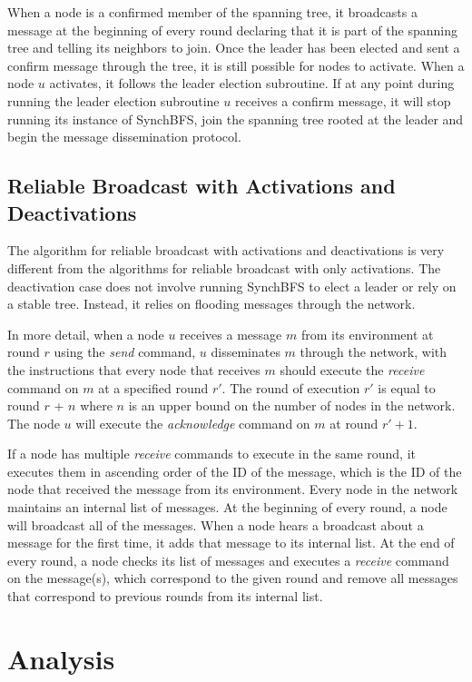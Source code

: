 \documentclass[english]{article}
\begin{document}
When a node is a confirmed member of the spanning tree, it broadcasts a message at the beginning of every round declaring that it is part of the spanning tree and telling its neighbors to join. Once the leader has been elected and sent a confirm message through the tree, it is still possible for nodes to activate. When a node $u$ activates, it follows the leader election subroutine. If at any point during running the leader election subroutine $u$ receives a confirm message, it will stop running its instance of SynchBFS, join the spanning tree rooted at the leader and begin the message dissemination protocol.


  \subsection {Reliable Broadcast with Activations and Deactivations}

The algorithm for reliable broadcast with activations and deactivations is very different from the algorithms for reliable broadcast with only activations. The deactivation case does not involve running SynchBFS to elect a leader or rely on a stable tree. Instead, it relies on flooding messages through the network.

In more detail, when a node $u$ receives a message $m$ from its environment at round $r$ using the \textit{send} command, $u$ disseminates $m$ through the network, with the instructions that every node that receives $m$ should execute the \textit{receive} command on $m$ at a specified round $r'$. The round of execution $r'$ is equal to round $r$ + $n$ where $n$ is an upper bound on the number of nodes in the network. The node $u$ will execute the \textit{acknowledge} command on $m$ at round $r' + 1$.

If a node has multiple \textit{receive} commands to execute in the same round, it executes them in ascending order of the ID of the message, which is the ID of the node that received the message from its environment. Every node in the network maintains an internal list of messages. At the beginning of every round, a node will broadcast all of the messages. When a node hears a broadcast about a message for the first time, it adds that message to its internal list. At the end of every round, a node checks its list of messages and executes a \textit{receive} command on the message(s), which correspond to the given round and remove all messages that correspond to previous rounds from its internal list.  


\section{Analysis}
\end{document}
